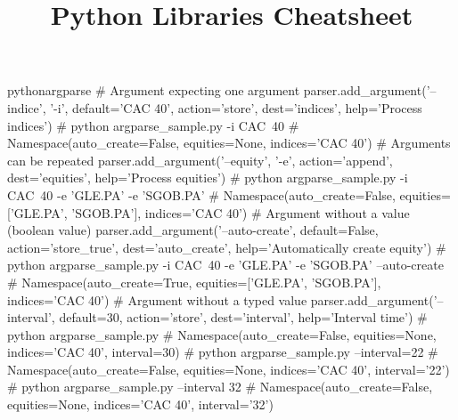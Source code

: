 \documentclass[10pt,a4paper]{article}
\title{\color{w3schools}Python Libraries Cheatsheet
}
\begin{document}
\maketitle

\small
\begin{multicols}{3}

\thispagestyle{empty}
\scriptsize



\begin{codebox}{python}{argparse}
    # Argument expecting one argument
    parser.add_argument('--indice', '-i', default='CAC 40', action='store', dest='indices', help='Process indices')
    # python argparse_sample.py -i CAC\ 40
    # Namespace(auto_create=False, equities=None, indices='CAC 40')
    # Arguments can be repeated
    parser.add_argument('--equity', '-e', action='append', dest='equities', help='Process equities')
    # python argparse_sample.py -i CAC\ 40 -e 'GLE.PA' -e 'SGOB.PA'
    # Namespace(auto_create=False, equities=['GLE.PA', 'SGOB.PA'], indices='CAC 40')
    # Argument without a value (boolean value)
    parser.add_argument('--auto-create', default=False, action='store_true', dest='auto_create', help='Automatically create equity')
    # python argparse_sample.py -i CAC\ 40 -e 'GLE.PA' -e 'SGOB.PA' --auto-create
    # Namespace(auto_create=True, equities=['GLE.PA', 'SGOB.PA'], indices='CAC 40')
    # Argument without a typed value
    parser.add_argument('--interval', default=30, action='store', dest='interval', help='Interval time')
    # python argparse_sample.py
    # Namespace(auto_create=False, equities=None, indices='CAC 40', interval=30)
    # python argparse_sample.py --interval=22
    # Namespace(auto_create=False, equities=None, indices='CAC 40', interval='22')
    # python argparse_sample.py --interval 32
    # Namespace(auto_create=False, equities=None, indices='CAC 40', interval='32')

\end{codebox}


\AtNextBibliography{\footnotesize}
\printbibliography  
\end{multicols}
\end{document}
